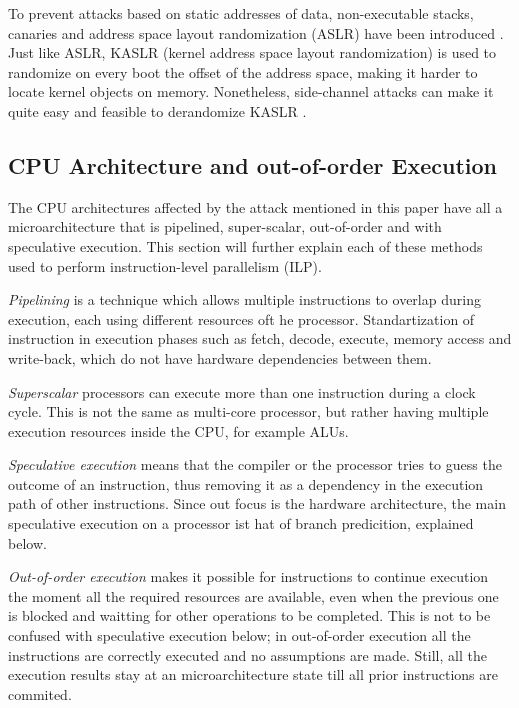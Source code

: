 \documentclass[sigconf]{acmart}
\begin{document}
To prevent attacks based on static addresses of data, non-executable stacks, canaries and address space layout randomization (ASLR) have been introduced \cite{}. Just like ASLR, KASLR (kernel address space layout randomization) is used to randomize on every boot the offset of the address space, making it harder to locate kernel objects on memory. Nonetheless, side-channel attacks can make it quite easy and feasible to derandomize KASLR \cite{}.

\subsection{CPU Architecture and out-of-order Execution}

The CPU architectures affected by the attack mentioned in this paper have all a microarchitecture that is pipelined, super-scalar, out-of-order and with speculative execution. This section will further explain each of these methods used to perform instruction-level parallelism (ILP).

{\itshape Pipelining} is a technique which allows multiple instructions to overlap during execution, each using different resources oft he processor. Standartization of instruction in execution phases such as fetch, decode, execute, memory access and write-back, which do not have hardware dependencies between them. 

{\itshape Superscalar} processors can execute more than one instruction during a clock cycle. This is not the same as multi-core processor, but rather having multiple execution resources inside the CPU, for example ALUs. 

{\itshape Speculative execution} means that the compiler or the processor tries to guess the outcome of an instruction, thus removing it as a dependency in the execution path of other instructions. Since out focus is the hardware architecture, the main speculative execution on a processor ist hat of branch predicition, explained below. 

{\itshape Out-of-order execution} makes it possible for instructions to continue execution the moment all the required resources are available, even when the previous one is blocked and waitting for other operations to be completed. This is not to be confused with speculative execution below; in out-of-order execution all the instructions are correctly executed and no assumptions are made. Still, all the execution results stay at an microarchitecture state till all prior instructions are commited. 
\end{document}
